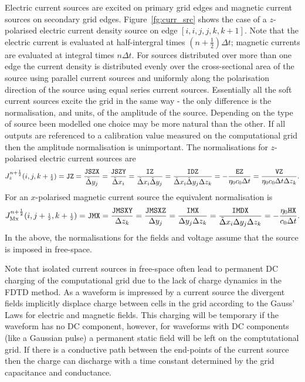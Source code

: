 \documentclass[onecolumn,a4paper]{article}
\newcommand{\half}{ {\scriptstyle \frac{1}{2}} }
\numberwithin{equation}{section}
\begin{document}
Electric current sources are excited on primary grid edges and magnetic current sources 
on secondary grid edges. Figure~\ref{fg:curr_src} shows the case of a $z$-polarised electric 
current density source on edge $[i,i,j,j,k,k+1]$. Note that the electric current is evaluated 
at half-intergral times $(n+\half) \Delta t$; magnetic currents are evaluated at integral times
$n \Delta t$.
For sources distributed over more than one edge the current density is distributed evenly over
the cross-sectional area of the source using parallel current sources and uniformly along the 
polarisation direction of the source using equal series current sources.
Essentially all the soft current sources excite the grid in the same way - the only difference
is the normalisation, and units, of the amplitude of the source. Depending on the type of
source been modelled one choice may be more natural than the other. If all outputs are
referenced to a calibration value measured on the computational grid then the amplitude
normalisation is unimportant. The normalisations for $z$-polarised electric current 
sources are
\begin{eqnarray}
J^{n+\half}_z(i,j,k+\half) 
= \mathtt{JZ} 
= \frac{\mathtt{JSZX}}{\tDelta y_j}
= \frac{\mathtt{JSZY}}{\tDelta x_i}  
= \frac{\mathtt{IZ}}{\tDelta x_i \tDelta y_j}
= \frac{\mathtt{IDZ}}{\tDelta x_i \tDelta y_j \Delta z_k}
= -\frac{\mathtt{EZ}}{\eta_0 c_0 \Delta t} 
= \frac{\mathtt{VZ}}{\eta_0 c_0 \Delta t  \Delta z_k}.
\end{eqnarray}
For an $x$-polarised magnetic current source the equivalent normalisation is
\begin{eqnarray}
J^{n+\half}_\mathrm{Mx}(i,j+\half,k+\half) 
= \mathtt{JMX} 
= \frac{\mathtt{JMSXY}}{\Delta z_k}
= \frac{\mathtt{JMSXZ}}{\Delta y_j}  
= \frac{\mathtt{IMX}}{\Delta y_j \Delta z_k}
= \frac{\mathtt{IMDX}}{\tDelta x_i \Delta y_j \Delta z_k}
= -\frac{\eta_0 \mathtt{HX}}{c_0 \Delta t}.
\end{eqnarray}
In the above, the normalisations for the fields and voltage assume that the source is imposed 
in free-space.

Note that isolated current sources in free-space often lead to permanent DC charging of the 
computational grid due to the lack of charge dynamics in the FDTD method. As a waveform is 
impressed by a current source the divergent fields implicitly displace charge between cells
in the grid according to the Gauss' Laws for electric and magnetic fields. This charging will
be temporary if the waveform has no DC component, however, for waveforms with DC components (like
a Gaussian pulse) a permanent static field will be left on the comptutational grid. If there 
is a conductive path between the end-points of the current source then the charge can discharge
with a time constant determined by the grid capacitance and conductance.
\end{document}
